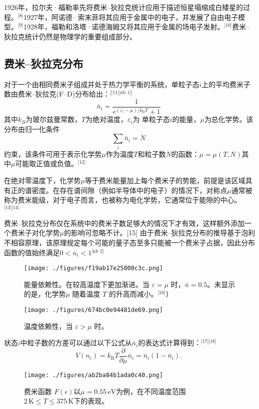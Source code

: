 1926年，拉尔夫·福勒率先将费米–狄拉克统计应用于描述恒星塌缩成白矮星的过程。\(^\text{[8]}\)1927年，阿诺德·索末菲将其应用于金属中的电子，并发展了自由电子模型。\(^\text{[9]}\)1928年，福勒和洛塔·诺德海姆又将其应用于金属的场电子发射。\(^\text{[10]}\)费米–狄拉克统计仍然是物理学的重要组成部分。
\subsection{费米–狄拉克分布}  
对于一个由相同费米子组成并处于热力学平衡的系统，单粒子态\( i \)上的平均费米子数由费米–狄拉克(F–D)分布给出：\(^\text{[[11][nb 1]]}\)   
\[
\bar{n}_{i} = \frac{1}{e^{(\varepsilon_{i} - \mu)/k_{\text{B}}T} + 1}~
\]
其中\(k_B\)为玻尔兹曼常数，\(T\)为绝对温度，\(\varepsilon_i\)为 单粒子态\(i\)的能量，\(\mu\)为总化学势。该分布由归一化条件
\[\sum_{i} \bar{n}_{i} = N~\]
约束，该条件可用于表示化学势\(\mu\)作为温度\(T\)和粒子数\(N\)的函数：\(\mu = \mu (T, N)\)其中\(\mu\)可能取正值或负值。\(^\text{[12]}\)

在绝对零温度下，化学势\(\mu\)等于费米能量加上每个费米子的势能，前提是该区域具有正的谱密度。在存在谱间隙（例如半导体中的电子）的情况下，对称点\(\mu\)通常被称为费米能级，对于电子而言，也被称为电化学势，它通常位于能隙的中心。\(^\text{[13][14]}\)

费米–狄拉克分布仅在系统中的费米子数足够大的情况下才有效，这样额外添加一个费米子对化学势\(\mu\)的影响可忽略不计。[15] 由于费米–狄拉克分布的推导基于泡利不相容原理，该原理规定每个可能的量子态至多只能被一个费米子占据，因此分布函数的值始终满足\(0 < \bar{n}_i < 1\)\(^\text{[nb 2]}\)

\begin{figure}[ht]
\centering
\texttt{[image: ./figures/f19ab17e25000c3c.png]}
\caption{能量依赖性。在较高温度下更加渐进。当 \( \varepsilon = \mu \) 时，\( \bar{n} = 0.5 \)。未显示的是，化学势\( \mu \) 随着温度 \( T \) 的升高而减小。\(^\text{[16]}\)）} \label{fig_FermiD_2}
\end{figure}
\begin{figure}[ht]
\centering
\texttt{[image: ./figures/674bc0e94481de69.png]}
\caption{温度依赖性，当 \( \varepsilon > \mu \) 时。} \label{fig_FermiD_3}
\end{figure}
状态\(i\)中粒子数的方差可以通过以下公式从\(\bar{n}_i\)的表达式计算得到：\(^\text{[17][18]}\)
\[V(n_{i}) = k_{\text{B}}T \frac{\partial}{\partial \mu} \bar{n}_{i} = \bar{n}_{i} (1 - \bar{n}_{i}).~\]
\begin{figure}[ht]
\centering
\texttt{[image: ./figures/ab2ba84b1ada0c40.png]}
\caption{费米函数 \( F(\epsilon) \)以\( \mu = 0.55 \, \text{eV} \)为例，在不同温度范围 \( 2 \, \text{K} \leq T \leq 375 \, \text{K} \)下的表现。} \label{fig_FermiD_4}
\end{figure}
